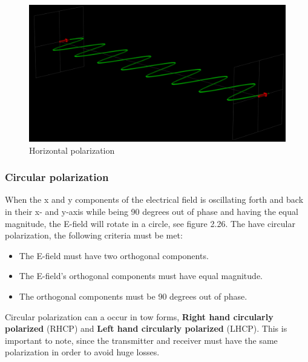 \begin{figure}[h]
\centering
\includegraphics[scale=0.25]{figures/HorizontalPolarization.PNG}
\caption{Horizontal polarization}
\end{figure}

\subsubsection{Circular polarization}
When the x and y components of the electrical field is oscillating forth and back in their x- and y-axis while being 90 degrees out of phase and having the equal magnitude, the E-field will rotate in a circle, see figure 2.26. The have circular polarization, the following criteria  must be met:

\begin{itemize}
  \item The E-field must have two orthogonal components.
  \item The E-field's orthogonal components must have equal magnitude.
  \item The orthogonal components must be 90 degrees out of phase.
\end{itemize}

Circular polarization can a occur in tow forms, \textbf{Right hand circularly polarized} (RHCP) and \textbf{Left hand circularly polarized} (LHCP). This is important to note, since the transmitter and receiver must have the same polarization in order to avoid huge losses. 

